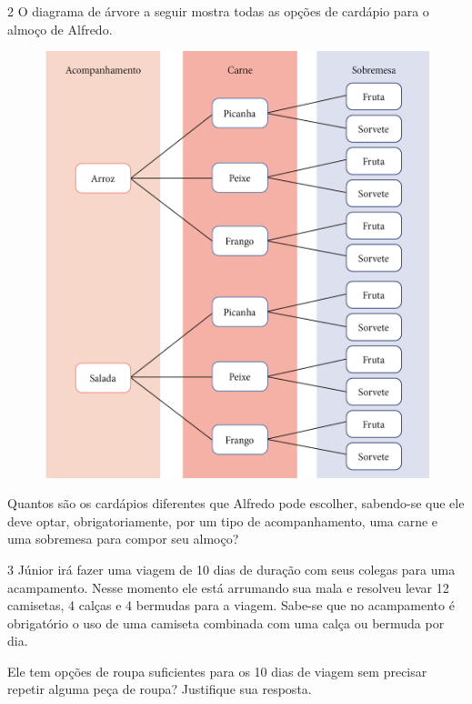 \num{2} O diagrama de árvore a seguir mostra todas as opções de cardápio
para o almoço de Alfredo.

\begin{figure}[htpb!]
\centering
\includegraphics[width=.7\textwidth]{../ilustracoes/MAT5/SAEB_5ANO_MAT_figura82.png}
\end{figure}

Quantos são os cardápios diferentes que Alfredo pode escolher, sabendo-se
que ele deve optar, obrigatoriamente, por um tipo de acompanhamento, uma
carne e uma sobremesa para compor seu almoço?


\num{3} Júnior irá fazer uma viagem de 10 dias de duração com seus colegas
para uma acampamento. Nesse momento ele está arrumando sua mala e
resolveu levar 12 camisetas, 4 calças e 4 bermudas para a viagem.
Sabe-se que no acampamento é obrigatório o uso de uma camiseta combinada
com uma calça ou bermuda por dia.

Ele tem opções de roupa suficientes para os 10 dias de viagem sem
precisar repetir alguma peça de roupa? Justifique sua resposta.

\bigskip\bigskip

